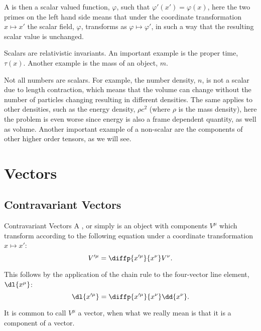 \documentclass[fleqn]{NotesClass}
\begin{document}
    A  is then a scalar valued function, \(\varphi\), such that \(\varphi'(x') = \varphi(x)\), here the two primes on the left hand side means that under the coordinate transformation \(x \mapsto x'\) the scalar field, \(\varphi\), transforms as \(\varphi \mapsto \varphi'\), in such a way that the resulting scalar value is unchanged.
    
    Scalars are relativistic invariants.
    An important example is the proper time, \(\tau(x)\).
    Another example is the mass of an object, \(m\).
    
    Not all numbers are scalars.
    For example, the number density, \(n\), is not a scalar due to length contraction, which means that the volume can change without the number of particles changing resulting in different densities.
    The same applies to other densities, such as the energy density, \(\rho c^2\) (where \(\rho\) is the mass density), here the problem is even worse since energy is also a frame dependent quantity, as well as volume.
    Another important example of a non-scalar are the components of other higher order tensors, as we will see.
    
    \section{Vectors}
    \subsection{Contravariant Vectors}
    \begin{dfn}{Contravariant Vectors}{}
        A , or simply   is an object with components \(V^\mu\) which transform according to the following equation under a coordinate transformation \(x \mapsto x'\):
        \begin{equation}
            V'^\mu = \diffp{x'^\mu}{x^\nu} V^\nu.
        \end{equation}
    \end{dfn}
    
    This follows by the application of the chain rule to the four-vector line element, \(\dl{x^\mu}\):
    \begin{equation}
        \dl{x'^\mu} = \diffp{x'^\mu}{x^\nu}\dd{x^\nu}.
    \end{equation}
    
    It is common to call \(V^\mu\) a vector, when what we really mean is that it is a component of a vector.
    
\end{document}
